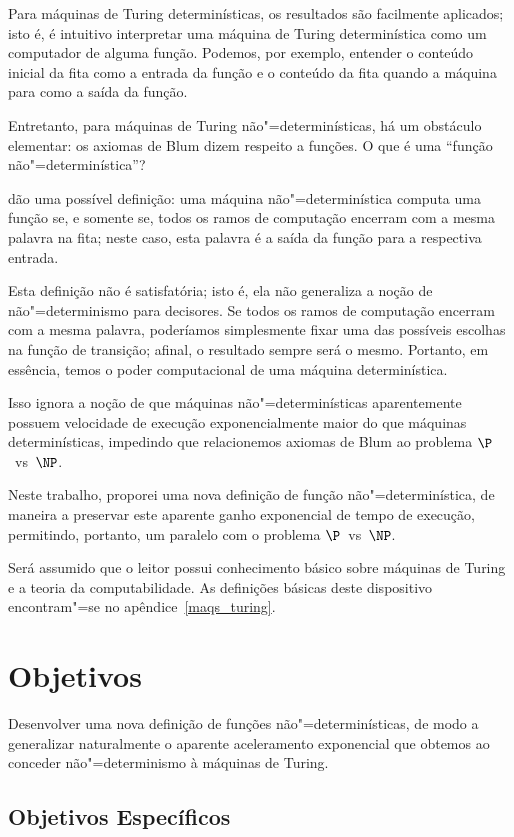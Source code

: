 Para máquinas de Turing determinísticas,
os resultados são facilmente aplicados;
isto é,
é intuitivo interpretar uma máquina de Turing determinística
como um computador de alguma função.
Podemos, por exemplo,
entender o conteúdo inicial da fita como a entrada da função
e o conteúdo da fita quando a máquina para como a saída da função.

Entretanto, para máquinas de Turing não"=determinísticas,
há um obstáculo elementar:
os axiomas de Blum dizem respeito a funções.
O que é uma ``função não"=determinística''?

 dão uma possível definição:
uma máquina não"=determinística computa uma função se,
e somente se,
todos os ramos de computação encerram com a mesma palavra na fita;
neste caso,
esta palavra é a saída da função para a respectiva entrada.

Esta definição não é satisfatória;
isto é, ela não generaliza a noção de não"=determinismo para decisores.
Se todos os ramos de computação encerram com a mesma palavra,
poderíamos simplesmente fixar uma das possíveis escolhas na função de transição;
afinal, o resultado sempre será o mesmo.
Portanto, em essência,
temos o poder computacional de uma máquina determinística.

Isso ignora a noção de que máquinas não"=determinísticas
aparentemente possuem velocidade de execução exponencialmente maior
do que máquinas determinísticas,
impedindo que relacionemos axiomas de Blum
ao problema $\P$~vs~$\NP$.

Neste trabalho,
proporei uma nova definição de função não"=determinística,
de maneira a preservar este aparente ganho exponencial de tempo de execução,
permitindo, portanto,
um paralelo com o problema $\P$~vs~$\NP$.

Será assumido que o leitor possui conhecimento básico
sobre máquinas de Turing e a teoria da computabilidade.
As definições básicas deste dispositivo
encontram"=se no apêndice~\ref{maqs_turing}.

\section{Objetivos}

Desenvolver uma nova definição de funções não"=determinísticas,
de modo a generalizar naturalmente o aparente aceleramento exponencial
que obtemos ao conceder não"=determinismo à máquinas de Turing.

\subsection[Objetivos específicos]{Objetivos Específicos\footnotemark}

